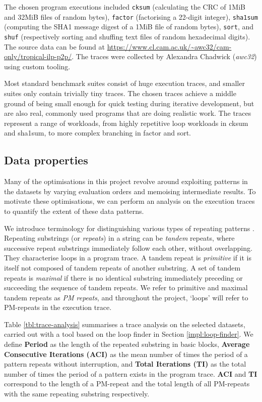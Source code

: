 The chosen program executions included \verb|cksum| (calculating the CRC of 1MiB and 32MiB files of random bytes),
\verb|factor| (factorising a 22-digit integer), \verb|sha1sum| (computing the SHA1 message digest of a 1MiB file of
random bytes), \verb|sort|, and \verb|shuf| (respectively sorting and shuffing text files of random hexadecimal digits).
The source data can be found at \url{https://www.cl.cam.ac.uk/~awc32/cam-only/tropical-ilp-p2p/}. The traces were 
collected by Alexandra Chadwick (\textit{awc32}) using custom tooling.

Most standard benchmark suites consist of huge execution traces, and smaller suites only contain trivially tiny traces.
The chosen traces achieve a middle ground of being small enough for quick testing during iterative development, but 
are also real, commonly used programs that are doing realistic work. The traces represent a range of workloads, 
from highly repetitive loop workloads in cksum and sha1sum, to more complex branching in factor and sort.

\subsection{Data properties} \label{prep:data-properties}

Many of the optimisations in this project revolve around exploiting patterns in the datasets by varying evaluation orders 
and memoising intermediate results. To motivate these optimisations, we can perform an analysis on the execution traces 
to quantify the extent of these data patterns.

We introduce terminology for distinguishing various types of repeating patterns \cite{PMRepeats}.
Repeating substrings (or \textit{repeats}) in a string can be \textit{tandem} repeats, where successive repeat
substrings immediately follow each other, without overlapping. They characterise loops in a program trace.
A tandem repeat is \textit{primitive} if it is itself not composed of tandem repeats of another substring.
A set of tandem repeats is \textit{maximal} if there is no identical substring immediately preceding or succeeding
the sequence of tandem repeats. We refer to primitive and maximal tandem 
repeats as \textit{PM repeats}, and throughout the project, `loops' will refer to PM-repeats in the execution trace.

Table \ref{tbl:trace-analysis} summarises a trace analysis on the 
selected datasets, carried out with a tool based on the loop finder in Section \ref{impl:loop-finder}. 
We define \textbf{Period} as the length of the repeated substring in basic blocks, \textbf{Average Consecutive Iterations (ACI)} as the 
mean number of times the period of a pattern repeats without interruption, and \textbf{Total Iterations (TI)} as the total number 
of times the period of a pattern exists in the program trace. \textbf{ACI} and \textbf{TI} correspond to the length of a PM-repeat and 
the total length of all PM-repeats with the same repeating substring respectively.

